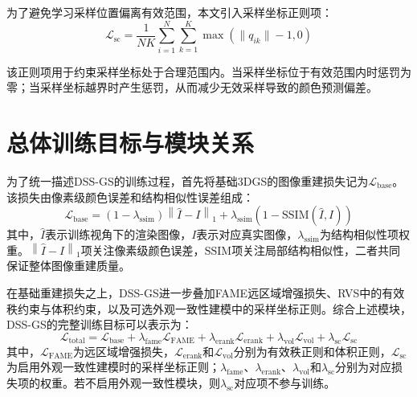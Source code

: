 为了避免学习采样位置偏离有效范围，本文引入采样坐标正则项：
\begin{equation}
    \mathcal{L}_{\mathrm{sc}}=\frac{1}{NK}\sum_{i=1}^{N}\sum_{k=1}^{K}\max\left(\|q_{ik}\|-1,0\right)
\end{equation}

该正则项用于约束采样坐标处于合理范围内。当采样坐标位于有效范围内时惩罚为零；当采样坐标越界时产生惩罚，从而减少无效采样导致的颜色预测偏差。

\section{总体训练目标与模块关系}

为了统一描述DSS-GS的训练过程，首先将基础3DGS的图像重建损失记为$\mathcal{L}_{\mathrm{base}}$。该损失由像素级颜色误差和结构相似性误差组成：
\begin{equation}
    \mathcal{L}_{\mathrm{base}}=(1-\lambda_{\mathrm{ssim}})\left\|\hat I-I\right\|_1+\lambda_{\mathrm{ssim}}\left(1-\mathrm{SSIM}(\hat I,I)\right)
\end{equation}
其中，$\hat I$表示训练视角下的渲染图像，$I$表示对应真实图像，$\lambda_{\mathrm{ssim}}$为结构相似性项权重。$\left\|\hat I-I\right\|_1$项关注像素级颜色误差，$\mathrm{SSIM}$项关注局部结构相似性，二者共同保证整体图像重建质量。

在基础重建损失之上，DSS-GS进一步叠加FAME远区域增强损失、RVS中的有效秩约束与体积约束，以及可选外观一致性建模中的采样坐标正则。综合上述模块，DSS-GS的完整训练目标可以表示为：
\begin{equation}
    \mathcal{L}_{\mathrm{total}}=\mathcal{L}_{\mathrm{base}}+\lambda_{\mathrm{fame}}\mathcal{L}_{\mathrm{FAME}}+\lambda_{\mathrm{erank}}\mathcal{L}_{\mathrm{erank}}+\lambda_{\mathrm{vol}}\mathcal{L}_{\mathrm{vol}}+\lambda_{\mathrm{sc}}\mathcal{L}_{\mathrm{sc}}
\end{equation}
其中，$\mathcal{L}_{\mathrm{FAME}}$为远区域增强损失，$\mathcal{L}_{\mathrm{erank}}$和$\mathcal{L}_{\mathrm{vol}}$分别为有效秩正则和体积正则，$\mathcal{L}_{\mathrm{sc}}$为启用外观一致性建模时的采样坐标正则；$\lambda_{\mathrm{fame}}$、$\lambda_{\mathrm{erank}}$、$\lambda_{\mathrm{vol}}$和$\lambda_{\mathrm{sc}}$分别为对应损失项的权重。若不启用外观一致性模块，则$\lambda_{\mathrm{sc}}$对应项不参与训练。

